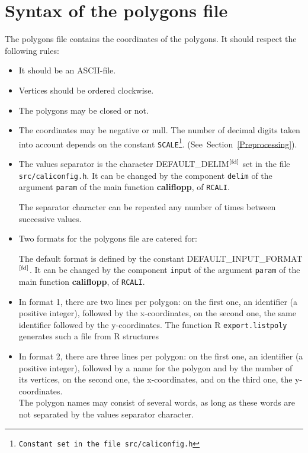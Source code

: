 \documentclass[a4paper,twoside,openright]{report}
\begin{document}
\section{Syntax of the polygons file}
\label{polyfile}

The polygons file contains the coordinates of the polygons.
It should
respect the following rules:

\begin{itemize}
\item
It  should be
an ASCII-file.
\item
Vertices should be  ordered  clockwise.
\item
The polygons may be closed or not.


\item
The coordinates may be negative or null.
The number of decimal digits taken into
account depends on the constant
\texttt{SCALE\footnote{\label{fd}Constant set in the file \texttt{src/caliconfig.h}}}.
(See~Section~\ref{Preprocessing}).

\item
The  values separator  is the character
DEFAULT\_DELIM$^\text{\ref{fd}}$
set in the file \texttt{src/caliconfig.h}.
It can be changed by the component
\texttt{delim} of the argument \texttt{param}
of the main function \textbf{califlopp}, of \verb+RCALI+.

The separator character can be repeated any number of times
between successive values.

\item
\label{formats}
Two formats for the 
\hypertarget{POLY}{polygons file} are catered for:

The default format is defined by the
constant DEFAULT\_INPUT\_FORMAT$^\text{\ref{fd}}$.
It can be changed by the component
\texttt{input} of the argument \texttt{param}
of the main function \textbf{califlopp}, of \verb+RCALI+.
\item
\label{format}
In format 1, there are two lines per polygon: on the first one,
    an identifier (a positive
    integer),   followed by the x-coordinates,
    on the second one, the same identifier
    followed by the y-coordinates. The function R
    \texttt{export.listpoly} generates such a file from R structures
\item
In format 2, there are three lines per polygon: on the first one,
    an identifier (a positive
    integer),   followed by a name for the polygon and
    by the number of its vertices, on the second one, the x-coordinates,
    and on the third one, the y-coordinates.\\
The polygon names may consist of several words, 
as long as these words are not separated by
the values separator character.

\end{itemize}
\end{document}
